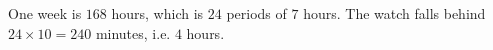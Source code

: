 One week is $168$ hours, which is $24$ periods of $7$ hours. The watch falls behind $24\times10=240$ minutes, i.e. $\boxed{4}$ hours.
